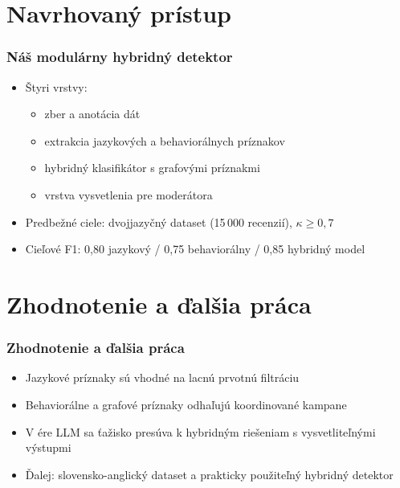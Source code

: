 \documentclass{beamer}
\begin{document}
\section{Navrhovaný prístup}

\begin{frame}[fragile=singleslide]\frametitle{Náš modulárny hybridný detektor}
\begin{itemize}
\item Štyri vrstvy:
	\begin{itemize}
	\item zber a anotácia dát
	\item extrakcia jazykových a behaviorálnych príznakov
	\item hybridný klasifikátor s grafovými príznakmi
	\item vrstva vysvetlenia pre moderátora
	\end{itemize}
\item Predbežné ciele: dvojjazyčný dataset (15\,000 recenzií), $\kappa \geq 0{,}7$
\item Cieľové F1: 0,80 jazykový / 0,75 behaviorálny / 0,85 hybridný model
\end{itemize}
\end{frame}


\section*{Zhodnotenie a ďalšia práca}

\begin{frame}[fragile=singleslide]\frametitle{Zhodnotenie a ďalšia práca}
\begin{itemize}
\item Jazykové príznaky sú vhodné na lacnú prvotnú filtráciu
\item Behaviorálne a grafové príznaky odhaľujú koordinované kampane
\item V ére LLM sa ťažisko presúva k hybridným riešeniam s vysvetliteľnými výstupmi
\item Ďalej: slovensko-anglický dataset a prakticky použiteľný hybridný detektor
\end{itemize}
\end{frame}
\end{document}
